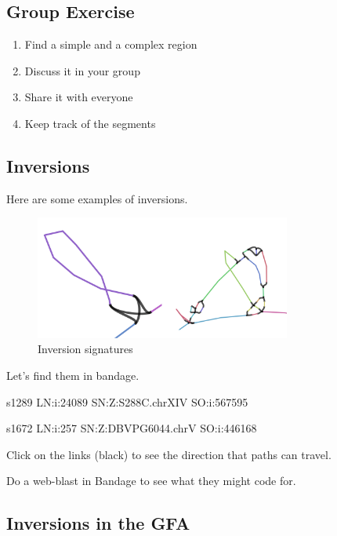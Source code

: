 \documentclass[
]{book}
\providecommand{\tightlist}{%
  \setlength{\itemsep}{0pt}\setlength{\parskip}{0pt}}
\begin{document}
\hypertarget{group-exercise-3}{%
\subsection*{Group Exercise}\label{group-exercise-3}}

\begin{enumerate}
\def\labelenumi{\arabic{enumi}.}
\tightlist
\item
  Find a simple and a complex region
\item
  Discuss it in your group
\item
  Share it with everyone
\item
  Keep track of the segments
\end{enumerate}

\hypertarget{inversions}{%
\subsection*{Inversions}\label{inversions}}

Here are some examples of inversions.

\begin{figure}
\centering
\includegraphics[width=0.75\textwidth,height=\textheight]{./Figures/Inversionsx2.png}
\caption{Inversion signatures}
\end{figure}

Let's find them in bandage.

s1289 LN:i:24089 SN:Z:S288C.chrXIV SO:i:567595

s1672 LN:i:257 SN:Z:DBVPG6044.chrV SO:i:446168

Click on the links (black) to see the direction that paths can travel.

Do a web-blast in Bandage to see what they might code for.

\hypertarget{inversions-in-the-gfa}{%
\subsection*{Inversions in the GFA}\label{inversions-in-the-gfa}}
\end{document}
